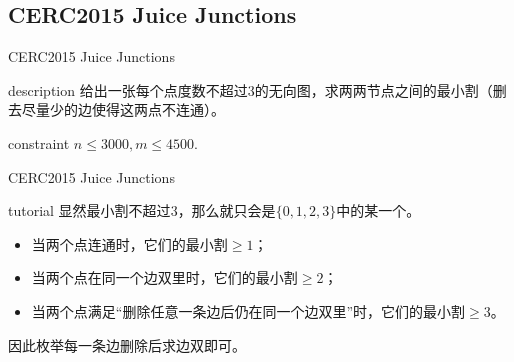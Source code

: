 \documentclass{beamer}
\begin{document}
\subsection{CERC2015 Juice Junctions}
\begin{frame}{CERC2015 Juice Junctions}
	\begin{block}{description}
		给出一张每个点度数不超过$3$的无向图，求两两节点之间的最小割（删去尽量少的边使得这两点不连通）。
	\end{block}
	\begin{block}{constraint}
		$n \le 3000, m \le 4500.$
	\end{block}
\end{frame}
\begin{frame}{CERC2015 Juice Junctions}
	\begin{block}{tutorial}
		显然最小割不超过$3$，那么就只会是$\{0, 1, 2, 3\}$中的某一个。	
		
		\begin{itemize}
			\item 当两个点连通时，它们的最小割$\ge 1$；
			\item 当两个点在同一个边双里时，它们的最小割$\ge 2$；
			\item 当两个点满足“删除任意一条边后仍在同一个边双里”时，它们的最小割$\ge 3$。
		\end{itemize}
	
		因此枚举每一条边删除后求边双即可。
	\end{block}
\end{frame}
\end{document}
